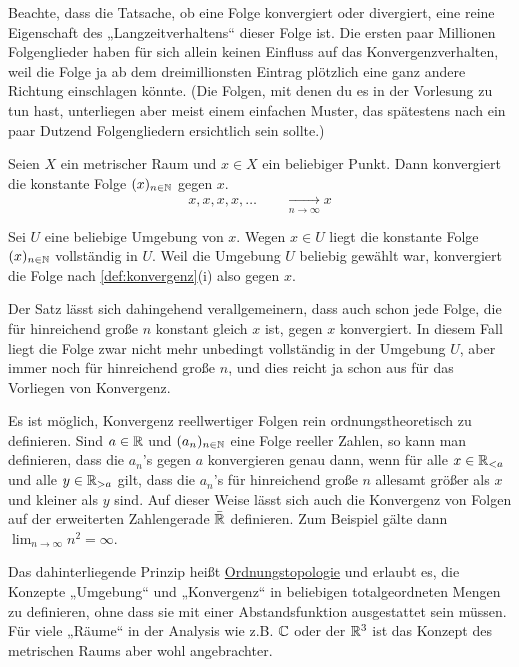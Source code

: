 \begin{bem}
    Beachte, dass die Tatsache, ob eine Folge konvergiert oder divergiert, eine reine Eigenschaft des „Langzeitverhaltens“ dieser Folge ist. Die ersten paar Millionen Folgenglieder haben für sich allein keinen Einfluss auf das Konvergenzverhalten, weil die Folge ja ab dem dreimillionsten Eintrag plötzlich eine ganz andere Richtung einschlagen könnte. (Die Folgen, mit denen du es in der Vorlesung zu tun hast, unterliegen aber meist einem einfachen Muster, das spätestens nach ein paar Dutzend Folgengliedern ersichtlich sein sollte.)
\end{bem}


\begin{bsp}
    Seien $X$ ein metrischer Raum und $x \in X$ ein beliebiger Punkt. Dann konvergiert die konstante Folge $(x)_{n\in \mathbb N}$ gegen $x$.
        \[ x,x,x,x,\dots \qquad \xrightarrow[n\to \infty]{} x \]
\end{bsp}
    
    
\begin{bew}
    Sei $U$ eine beliebige Umgebung von $x$. Wegen $x\in U$ liegt die konstante Folge $(x)_{n\in \mathbb N}$ vollständig in $U$. Weil die Umgebung $U$ beliebig gewählt war, konvergiert die Folge nach \cref{def:konvergenz}(i) also gegen $x$.
\end{bew}


\begin{bem}
    Der Satz lässt sich dahingehend verallgemeinern, dass auch schon jede Folge, die für hinreichend große $n$ konstant gleich $x$ ist, gegen $x$ konvergiert. In diesem Fall liegt die Folge zwar nicht mehr unbedingt vollständig in der Umgebung $U$, aber immer noch für hinreichend große $n$, und dies reicht ja schon aus für das Vorliegen von Konvergenz.
\end{bem}


\begin{vorschau}[* Ordnungstopologie]
    Es ist möglich, Konvergenz reellwertiger Folgen rein ordnungstheoretisch zu definieren. Sind $a\in \mathbb R$ und $(a_n)_{n\in \mathbb N}$ eine Folge reeller Zahlen, so kann man definieren, dass die $a_n$'s gegen $a$ konvergieren genau dann, wenn für alle $x\in \mathbb R_{<a}$ und alle $y\in \mathbb R_{>a}$ gilt, dass die $a_n$'s für hinreichend große $n$ allesamt größer als $x$ und kleiner als $y$ sind. Auf dieser Weise lässt sich auch die Konvergenz von Folgen auf der erweiterten Zahlengerade $\bar {\mathbb R}$ definieren. Zum Beispiel gälte dann $\lim_{n\to\infty} n^2=\infty$.
    
    Das dahinterliegende Prinzip heißt \href{https://de.wikipedia.org/wiki/Ordnungstopologie}{Ordnungstopologie} und erlaubt es, die Konzepte „Umgebung“ und „Konvergenz“ in beliebigen totalgeordneten Mengen zu definieren, ohne dass sie mit einer Abstandsfunktion ausgestattet sein müssen. Für viele „Räume“ in der Analysis wie z.B. $\mathbb C$ oder der $\mathbb R^3$ ist das Konzept des metrischen Raums aber wohl angebrachter.
\end{vorschau}





